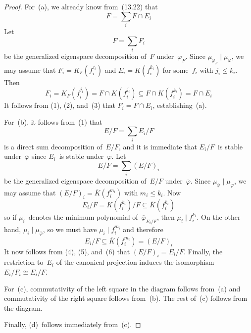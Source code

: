\documentclass[letterpaper,12pt]{article}
\newcommand{\iso}{\cong}
\newcommand{\divides}{\mid}
\newcommand{\sect}{\cap}
\newcommand{\proj}[1]{\overline{#1}}
\theoremstyle{definition}
\theoremstyle{remark}
\begin{document}
\begin{proof}
For~(a), we already know from~(13.22) that
\[F=\sum_i F\sect E_i\tag{1}\]
Let
\[F=\sum_i F_i\tag{2}\]
be the generalized eigenspace decomposition of~\(F\) under~\(\varphi_F\). Since \(\mu_{\varphi_F}\divides\mu_{\varphi}\), we may assume that \(F_i=K_F(f_i^{j_i})\) and \(E_i=K(f_i^{k_i})\) for some~\(f_i\) with \(j_i\le k_i\). Then
\[F_i=K_F(f_i^{j_i})=F\sect K(f_i^{j_i})\subseteq F\sect K(f_i^{k_i})=F\sect E_i\tag{3}\]
It follows from (1), (2), and~(3) that \(F_i=F\sect E_i\), establishing~(a).

For~(b), it follows from~(1) that
\[E/F=\sum_i E_i/F\tag{4}\]
is a direct sum decomposition of~\(E/F\), and it is immediate that \(E_i/F\)~is stable under~\(\proj{\varphi}\) since \(E_i\)~is stable under~\(\varphi\). Let
\[E/F=\sum_i(E/F)_i\tag{5}\]
be the generalized eigenspace decomposition of~\(E/F\) under~\(\proj{\varphi}\). Since \(\mu_{\proj{\varphi}}\divides\mu_{\varphi}\), we may assume that \((E/F)_i=\proj{K}(f_i^{m_i})\) with \(m_i\le k_i\). Now
\[E_i/F=K(f_i^{k_i})/F\subseteq\proj{K}(f_i^{k_i})\]
so if \(\mu_i\)~denotes the minimum polynomial of~\(\proj{\varphi}_{E_i/F}\), then \(\mu_i\divides f_i^{k_i}\). On the other hand, \(\mu_i\divides\mu_{\proj{\varphi}}\), so we must have \(\mu_i\divides f_i^{m_i}\) and therefore
\[E_i/F\subseteq\proj{K}(f_i^{m_i})=(E/F)_i\tag{6}\]
It now follows from (4), (5), and~(6) that \((E/F)_i=E_i/F\). Finally, the restriction to~\(E_i\) of the canonical projection induces the isomorphism \(E_i/F_i\iso E_i/F\).

For~(c), commutativity of the left square in the diagram follows from~(a) and commutativity of the right square follows from~(b). The rest of~(c) follows from the diagram.

Finally, (d)~follows immediately from~(c).
\end{proof}
\end{document}
